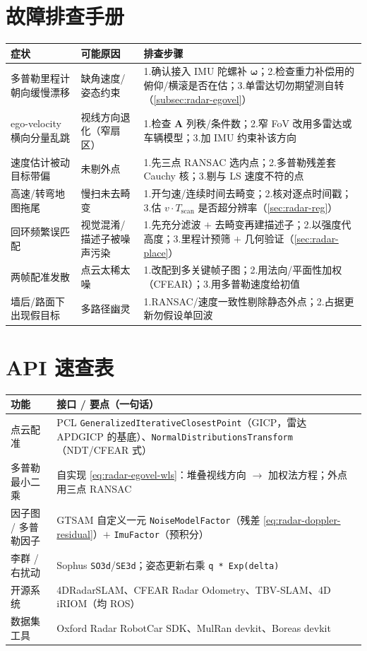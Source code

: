 \section*{故障排查手册}
\begin{table}[H]\centering\small
\begin{tabular}{p{} p{} p{}}
\toprule
症状 & 可能原因 & 排查步骤 \\
\midrule
多普勒里程计朝向缓慢漂移 & 缺角速度/姿态约束 & 1.确认接入 IMU 陀螺补 $\boldsymbol\omega$；2.检查重力补偿用的俯仰/横滚是否在估；3.单雷达切勿期望测自转（\cref{subsec:radar-egovel}）\\
ego-velocity 横向分量乱跳 & 视线方向退化（窄扇区） & 1.检查 $\mathbf A$ 列秩/条件数；2.窄 FoV 改用多雷达或车辆模型；3.加 IMU 约束补该方向 \\
速度估计被动目标带偏 & 未剔外点 & 1.先三点 RANSAC 选内点；2.多普勒残差套 Cauchy 核；3.剔与 LS 速度不符的点 \\
高速/转弯地图拖尾 & 慢扫未去畸变 & 1.开匀速/连续时间去畸变；2.核对逐点时间戳；3.估 $v\cdot T_{\text{scan}}$ 是否超分辨率（\cref{sec:radar-reg}）\\
回环频繁误匹配 & 视觉混淆/描述子被噪声污染 & 1.先充分滤波 $+$ 去畸变再建描述子；2.以强度代高度；3.里程计预筛 $+$ 几何验证（\cref{sec:radar-place}）\\
两帧配准发散 & 点云太稀太噪 & 1.改配到多关键帧子图；2.用法向/平面性加权（CFEAR）；3.用多普勒速度给初值 \\
墙后/路面下出现假目标 & 多路径幽灵 & 1.RANSAC/速度一致性剔除静态外点；2.占据更新勿假设单回波 \\
\bottomrule
\end{tabular}
\end{table}

\section*{API 速查表}
\begin{table}[H]\centering\small
\begin{tabular}{p{} p{}}
\toprule
功能 & 接口 / 要点（一句话） \\
\midrule
点云配准 & PCL \texttt{GeneralizedIterativeClosestPoint}（GICP，雷达 APDGICP 的基底）、\texttt{NormalDistributionsTransform}（NDT/CFEAR 式） \\
多普勒最小二乘 & 自实现 \cref{eq:radar-egovel-wls}：堆叠视线方向 $\to$ 加权法方程；外点用三点 RANSAC \\
因子图 / 多普勒因子 & GTSAM 自定义一元 \texttt{NoiseModelFactor}（残差 \cref{eq:radar-doppler-residual}）$+$ \texttt{ImuFactor}（预积分） \\
李群 / 右扰动 & Sophus \texttt{SO3d}/\texttt{SE3d}；姿态更新右乘 \texttt{q * Exp(delta)} \\
开源系统 & 4DRadarSLAM、CFEAR Radar Odometry、TBV-SLAM、4D iRIOM（均 ROS） \\
数据集工具 & Oxford Radar RobotCar SDK、MulRan devkit、Boreas devkit \\
\bottomrule
\end{tabular}
\end{table}

